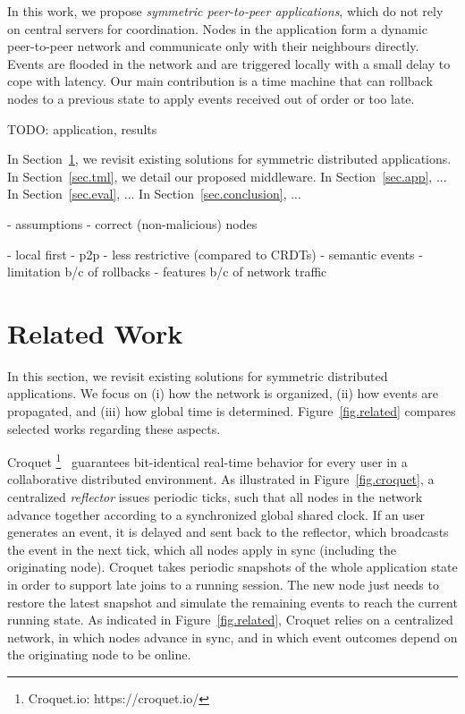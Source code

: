 \documentclass[10pt,journal,compsoc]{IEEEtran}
\begin{document}
In this work, we propose \emph{symmetric peer-to-peer applications}, which
do not rely on central servers for coordination.
Nodes in the application form a dynamic peer-to-peer network and communicate
only with their neighbours directly.
Events are flooded in the network and are triggered locally with a small
delay to cope with latency.
Our main contribution is a time machine that can rollback nodes to a previous
state to apply events received out of order or too late.

TODO: application, results

In Section~\ref{sec.related}, we revisit existing solutions for symmetric
distributed applications.
In Section~\ref{sec.tml}, we detail our proposed middleware.
In Section~\ref{sec.app}, ...
In Section~\ref{sec.eval}, ...
In Section~\ref{sec.conclusion}, ...

- assumptions
    - correct (non-malicious) nodes

- local first
- p2p
- less restrictive (compared to CRDTs)
- semantic events
    - limitation b/c of rollbacks
    - features b/c of network traffic

\section{Related Work}
\label{sec.related}

In this section, we revisit existing solutions for symmetric distributed
applications.
We focus on (i) how the network is organized, (ii) how events are propagated,
and (iii) how global time is determined.
Figure~\ref{fig.related} compares selected works regarding these aspects.

Croquet%
\footnote{Croquet.io: https://croquet.io/}~\cite{TODO} guarantees
bit-identical real-time behavior for every user in a collaborative
distributed environment.
%
As illustrated in Figure~\ref{fig.croquet}, a centralized \emph{reflector}
issues periodic ticks, such that all nodes in the network advance together
according to a synchronized global shared clock.
If an user generates an event, it is delayed and sent back to the reflector,
which broadcasts the event in the next tick, which all nodes apply in sync
(including the originating node).
%
Croquet takes periodic snapshots of the whole application state in order to
support late joins to a running session.
The new node just needs to restore the latest snapshot and simulate the
remaining events to reach the current running state.
%
As indicated in Figure~\ref{fig.related}, Croquet relies on a centralized
network, in which nodes advance in sync, and in which event outcomes depend
on the originating node to be online.
\end{document}
